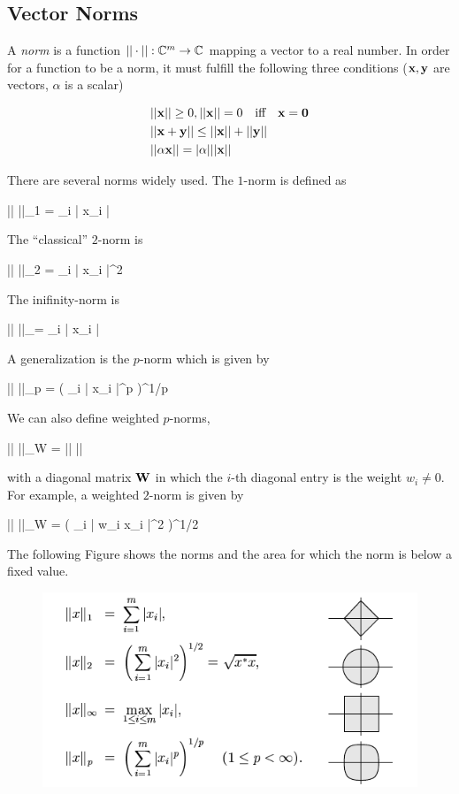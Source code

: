 
\subsection{Vector Norms}

A \emph{norm} is a function $|| \cdot || : \mathbb{C}^m \rightarrow \mathbb{C}$ mapping a vector to a real number. In order for a function to be a norm, it must fulfill the following three conditions ($\mathbf{x}, \mathbf{y}$ are vectors, $\alpha$ is a scalar)

\begin{align*}
  & || \mathbf{x} || \geq 0, || \mathbf{x} || = 0 \quad \text{iff} \quad \mathbf{x} = \mathbf{0} \\
  & || \mathbf{x} + \mathbf{y} || \leq || \mathbf{x} || + || \mathbf{y} || \\
  & || \alpha \mathbf{x} || = |\alpha| || \mathbf{x} ||
\end{align*}

There are several norms widely used. The $1$-norm is defined as

\bee
|| \xbf ||_1 = \sum_i | x_i |
\eee

The ``classical'' $2$-norm is

\bee
|| \xbf ||_2 = \sum_i | x_i |^2
\eee

The inifinity-norm is

\bee
|| \xbf ||_\infty = \max_i | x_i |
\eee

A generalization is the $p$-norm which is given by

\bee
|| \xbf ||_p = \left( \sum_i | x_i |^p \right)^{1/p}
\eee

We can also define weighted $p$-norms,

\bee
|| \xbf ||_W = || \Wbf \xbf ||
\eee

with a diagonal matrix $\mathbf{W}$ in which the $i$-th diagonal entry is the weight $w_i \neq 0$. For example, a weighted $2$-norm is given by

\bee
|| \xbf ||_W = \left( \sum_i | w_i x_i |^2 \right)^{1/2}
\eee

The following Figure shows the norms and the area for which the norm is below a fixed value.

\begin{figure}[hbt!]
\centering
\includegraphics[scale=0.5]{images/num_lin_alg_2_1.png}
\end{figure}


